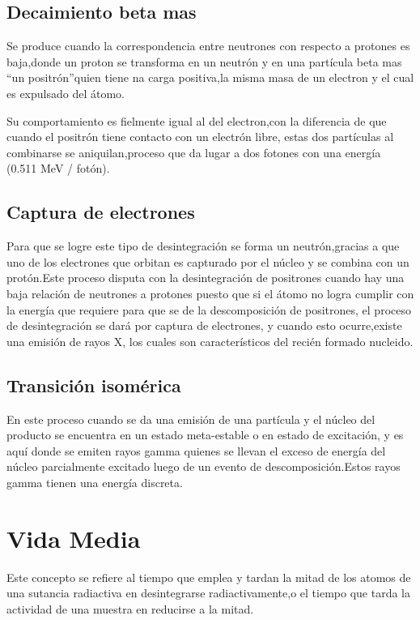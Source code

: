 \documentclass[12pt,fleqn]{book} %
\numberwithin{equation}{section} %
\numberwithin{figure}{section} %
\numberwithin{table}{section} %
\begin{document}
\subsection{Decaimiento beta mas}
Se produce cuando la correspondencia entre neutrones con respecto a protones es baja,donde un proton se transforma en un neutrón y en una partícula beta mas \textquotedblleft un positrón\textquotedblright quien tiene na carga positiva,la misma masa de un electron y el cual es expulsado del átomo.

Su comportamiento es fielmente igual al del electron,con la diferencia de que cuando el positrón tiene contacto con un electrón libre, estas dos partículas al combinarse se aniquilan,proceso que da lugar a dos fotones con una energía (0.511 MeV / fotón).



\subsection{Captura de electrones}
Para que se logre este tipo de desintegración se forma un neutrón,gracias a que  uno de los electrones que orbitan es capturado por el núcleo y se combina con un protón.Este proceso disputa con la desintegración de positrones cuando hay una baja relación de neutrones a protones puesto que si el átomo no logra cumplir con la energía que requiere para que se de la descomposición de positrones, el proceso de desintegración se dará por captura de electrones, y cuando esto ocurre,existe una emisión de rayos X, los cuales son característicos del recién formado nucleido.

\subsection{Transición isomérica}
En este proceso cuando se da una emisión de una partícula y el núcleo del producto se encuentra en un estado meta-estable o en estado de excitación, y es aquí donde se emiten rayos gamma quienes se llevan el exceso de energía del núcleo parcialmente excitado luego de un evento de descomposición.Estos rayos gamma tienen una energía discreta.
 
\section{Vida Media}
Este concepto se refiere al tiempo que emplea y tardan la mitad de los atomos de una sutancia radiactiva en desintegrarse radiactivamente,o el tiempo que tarda la actividad de una muestra en reducirse a la mitad.
\end{document}
